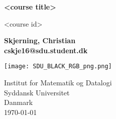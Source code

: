 \begin{titlepage}
	\begin{center}
    	\vspace*{1cm}
		\Huge
       	\textbf{<course title>}
 		
       	\vspace{0.5cm}
		\LARGE        
		<course id>
 		
 		\normalsize
       	\vspace{1.5cm}
       	\textbf{Skjerning, Christian\\ cskje16@sdu.student.dk}
       	\vfill
 
       	\vspace{1.8cm}
       	\begin{center}
       		\texttt{[image: SDU\_BLACK\_RGB\_png.png]}
       	\end{center}
	 	\vspace{1.8cm}
	 	
	 	Institut for Matematik og Datalogi \\ Syddansk Universitet \\ Danmark \\
       	\today
 
   	\end{center}
\end{titlepage}